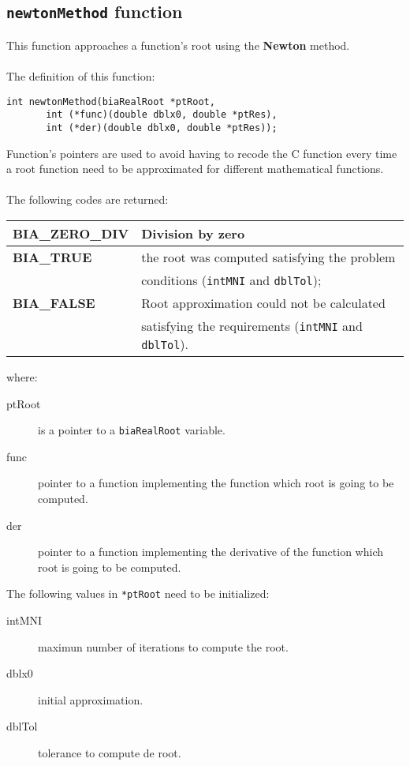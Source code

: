 \subsection{\texttt{newtonMethod} function}

This function approaches a function's root using the \textbf{Newton} method.\\ \\
%
The definition of this function:
%
\begin{verbatim}
int newtonMethod(biaRealRoot *ptRoot, 
       int (*func)(double dblx0, double *ptRes),
       int (*der)(double dblx0, double *ptRes));  
\end{verbatim}
%
Function's pointers are used to avoid having to recode the C function every time a root function need to be approximated for different mathematical functions.\\ \\
%
The following codes are returned:
%
\begin{center}
\begin{tabular}{|l|l|}
\hline
\textbf{BIA\_ZERO\_DIV} & Division by zero \\
\hline
\textbf{BIA\_TRUE} & the root was computed satisfying the problem \\
                   & conditions (\texttt{intMNI} and \texttt{dblTol}); \\
\hline
\textbf{BIA\_FALSE} & Root approximation could not be calculated \\
                    & satisfying the requirements (\texttt{intMNI} and \texttt{dblTol}). \\
\hline
\end{tabular}
\end{center}
%
where:
%
\begin{description}
\item[ptRoot] is a pointer to a \texttt{biaRealRoot} variable.
\item[func] pointer to a function implementing the function which root is going to be computed.
\item[der] pointer to a function implementing the derivative of the function which root is going to be computed.
\end{description}
%
The following values in \texttt{*ptRoot} need to be initialized:
%
\begin{description}
\item[intMNI] maximun number of iterations to compute the root.
\item[dblx0] initial approximation.
\item[dblTol] tolerance to compute de root.
\end{description}
